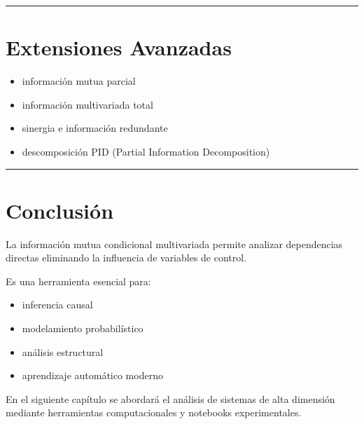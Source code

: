 \documentclass[letterpaper,10pt,english]{jupyterBook}
\begin{document}
\bigskip\hrule\bigskip



\section{Extensiones Avanzadas}
\label{\detokenize{03_multivariate_models/conditional_mi:extensiones-avanzadas}}\begin{itemize}
\item {} 
\sphinxAtStartPar
información mutua parcial

\item {} 
\sphinxAtStartPar
información multivariada total

\item {} 
\sphinxAtStartPar
sinergia e información redundante

\item {} 
\sphinxAtStartPar
descomposición PID (Partial Information Decomposition)

\end{itemize}


\bigskip\hrule\bigskip



\section{Conclusión}
\label{\detokenize{03_multivariate_models/conditional_mi:conclusion}}
\sphinxAtStartPar
La información mutua condicional multivariada permite analizar
dependencias directas eliminando la influencia de variables de control.

\sphinxAtStartPar
Es una herramienta esencial para:
\begin{itemize}
\item {} 
\sphinxAtStartPar
inferencia causal

\item {} 
\sphinxAtStartPar
modelamiento probabilístico

\item {} 
\sphinxAtStartPar
análisis estructural

\item {} 
\sphinxAtStartPar
aprendizaje automático moderno

\end{itemize}

\sphinxAtStartPar
En el siguiente capítulo se abordará el análisis de sistemas
de alta dimensión mediante herramientas computacionales
y notebooks experimentales.
\end{document}
